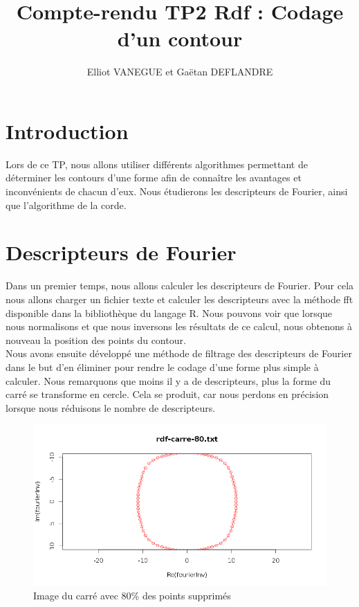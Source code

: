 \documentclass[11pt]{article}
\title{Compte-rendu TP2 Rdf : Codage d'un contour}
\author{Elliot VANEGUE et Gaëtan DEFLANDRE}
\begin{document}


  \maketitle
  
  \mbox{}
  \newpage
  \clearpage
  
  \section{Introduction}
  Lors de ce TP, nous allons utiliser différents algorithmes permettant de déterminer
  les contours d'une forme afin de connaître les avantages et inconvénients de chacun
  d'eux. Nous étudierons les descripteurs de Fourier, ainsi que l'algorithme
  de la corde.
  
  \section{Descripteurs de Fourier}
  Dans un premier temps, nous allons calculer les descripteurs de Fourier. Pour cela
  nous allons charger un fichier texte et calculer les descripteurs avec la méthode
  fft disponible dans la bibliothèque du langage R. Nous pouvons voir que lorsque
  nous normalisons et que nous inversons les résultats de ce calcul, nous obtenons
  à nouveau la position des points du contour.\\ 
  
  Nous avons ensuite développé une méthode de filtrage des descripteurs de Fourier dans le
  but d'en éliminer pour rendre le codage d'une forme plus simple à calculer.
  Nous remarquons que moins il y a de descripteurs, plus la forme du carré se transforme en cercle.
  Cela se produit, car nous perdons en précision lorsque nous réduisons le nombre de descripteurs.
  
  \begin{figure}[!h]
    \includegraphics[width=15cm]{../resultat/carre-fourier-20.png}
    \caption{Image du carré avec 80\% des points supprimés}
  \end{figure}
  
\end{document}
